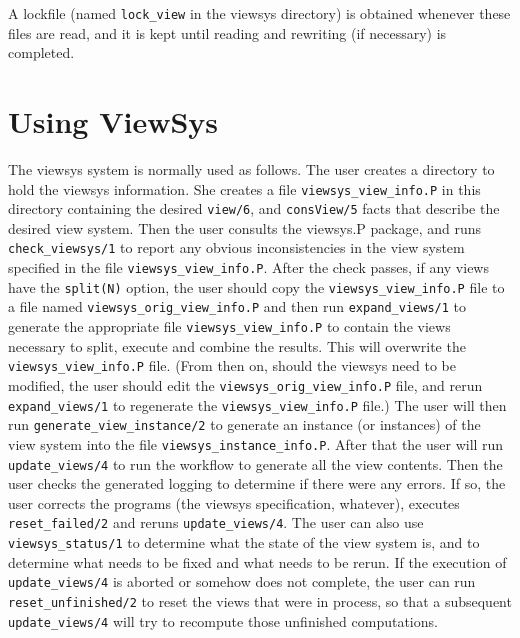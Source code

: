 A lockfile (named {\tt lock\_view} in the viewsys directory) is
obtained whenever these files are read, and it is kept until reading
and rewriting (if necessary) is completed.

\section{Using ViewSys}

The viewsys system is normally used as follows.  The user creates a
directory to hold the viewsys information.  She creates a file
{\tt viewsys\_view\_info.P} in this directory containing the desired
{\tt view/6}, and {\tt consView/5} facts that describe the desired
view system.  Then the user consults the viewsys.P package, and runs
{\tt check\_viewsys/1} to report any obvious inconsistencies in the
view system specified in the file {\tt viewsys\_view\_info.P}.  After
the check passes, if any views have the {\tt split(N)} option, the user
should copy the {\tt viewsys\_view\_info.P} file to a file named
{\tt viewsys\_orig\_view\_info.P} and then run {\tt expand\_views/1} to
generate the appropriate file {\tt viewsys\_view\_info.P} to contain
the views necessary to split, execute and combine the results.  This
will overwrite the {\tt viewsys\_view\_info.P} file.  (From then on,
should the viewsys need to be modified, the user should edit the
{\tt viewsys\_orig\_view\_info.P} file, and rerun {\tt expand\_views/1}
to regenerate the {\tt viewsys\_view\_info.P} file.)  The user will
then run {\tt generate\_view\_instance/2} to generate an instance (or
instances) of the view system into the file
{\tt viewsys\_instance\_info.P}.  After that the user will run
{\tt update\_views/4} to run the workflow to generate all the view
contents.  Then the user checks the generated logging to determine if
there were any errors.  If so, the user corrects the programs (the
viewsys specification, whatever), executes {\tt reset\_failed/2} and
reruns {\tt update\_views/4}.  The user can also use
{\tt viewsys\_status/1} to determine what the state of the view system
is, and to determine what needs to be fixed and what needs to be
rerun.  If the execution of {\tt update\_views/4} is aborted or
somehow does not complete, the user can run {\tt reset\_unfinished/2}
to reset the views that were in process, so that a subsequent
{\tt update\_views/4} will try to recompute those unfinished
computations.

